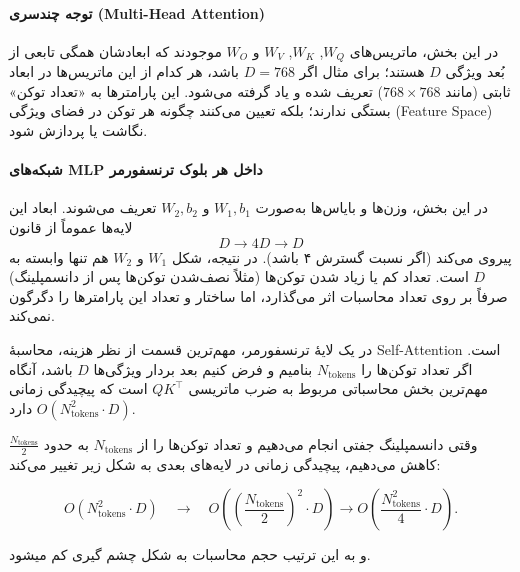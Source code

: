 \paragraph{توجه چندسری (Multi-Head Attention)}
در این بخش، ماتریس‌های $W_Q$, $W_K$, $W_V$ و $W_O$ موجودند که ابعادشان همگی تابعی از بُعد ویژگی $D$ هستند؛ برای مثال اگر $D = 768$ باشد، هر کدام از این ماتریس‌ها در ابعاد ثابتی (مانند $768 \times 768$) تعریف شده و یاد گرفته می‌شود. این پارامترها به «تعداد توکن» بستگی ندارند؛ بلکه تعیین می‌کنند چگونه هر توکن در فضای ویژگی (Feature Space) نگاشت یا پردازش شود.

\paragraph{شبکه‌های MLP داخل هر بلوک ترنسفورمر}
در این بخش، وزن‌ها و بایاس‌ها به‌صورت $W_1, b_1$ و $W_2, b_2$ تعریف می‌شوند. ابعاد این لایه‌ها عموماً از قانون 
\[
D \to 4D \to D
\]
پیروی می‌کند (اگر نسبت گسترش ۴ باشد). در نتیجه، شکل $W_1$ و $W_2$ هم تنها وابسته به $D$ است. تعداد کم یا زیاد شدن توکن‌ها (مثلاً نصف‌شدن توکن‌ها پس از دانسمپلینگ) صرفاً بر روی تعداد محاسبات اثر می‌گذارد، اما ساختار و تعداد این پارامترها را دگرگون نمی‌کند.


در یک لایۀ ترنسفورمر، مهم‌ترین قسمت از نظر هزینه، محاسبۀ Self-Attention است. اگر تعداد توکن‌ها را $N_{\text{tokens}}$ بنامیم و فرض کنیم بعد بردار ویژگی‌ها $D$ باشد، آنگاه مهم‌ترین بخش محاسباتی مربوط به ضرب ماتریسی $QK^\top$ است که پیچیدگی زمانی \( O(N_{\text{tokens}}^2 \cdot D) \) دارد.


وقتی دانسمپلینگ جفتی انجام می‌دهیم و تعداد توکن‌ها را از $N_{\text{tokens}}$ به حدود $\frac{N_{\text{tokens}}}{2}$ کاهش می‌دهیم، پیچیدگی زمانی در لایه‌های بعدی به شکل زیر تغییر می‌کند:

\[
O(N_{\text{tokens}}^2 \cdot D) \quad \longrightarrow \quad O\left(\left(\frac{N_{\text{tokens}}}{2}\right)^2 \cdot D\right) \longrightarrow  O\left(\frac{N_{\text{tokens}}^2}{4} \cdot D\right).
\]

و به این ترتیب حجم محاسبات به شکل چشم گیری کم میشود.






